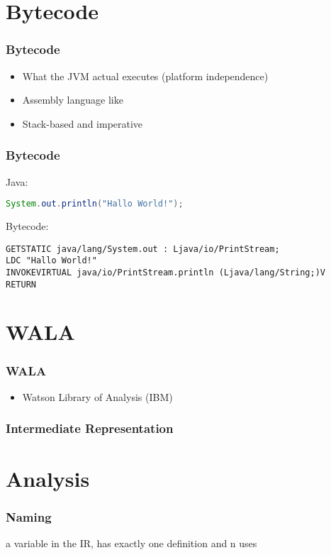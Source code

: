 \documentclass{beamer}
\begin{document}
\section{Bytecode}

\begin{frame}
   \frametitle{Bytecode}
   \begin{itemize}
      \item What the JVM actual executes (platform independence)
      \item Assembly language like 
      \item Stack-based and imperative
   \end{itemize}    
\end{frame}


\begin{frame}[fragile]
   \frametitle{Bytecode}
   Java:
   \begin{lstlisting}[language=Java]
System.out.println("Hallo World!");
  \end{lstlisting}%
  Bytecode:
  \begin{lstlisting}[language=Bytecode]
GETSTATIC java/lang/System.out : Ljava/io/PrintStream;
LDC "Hallo World!"
INVOKEVIRTUAL java/io/PrintStream.println (Ljava/lang/String;)V
RETURN
  \end{lstlisting}  
\end{frame}

\section{WALA}

\begin{frame}
   \frametitle{WALA}
   \begin{itemize}
      \item Watson Library of Analysis (IBM)
      
   \end{itemize}

\end{frame}

\begin{frame}
   \frametitle{Intermediate Representation}
   
   
\end{frame}

\section{Analysis}

\begin{frame}
   \frametitle{Naming}
   a variable in the IR, has exactly one definition and n uses
\end{frame}
\end{document}
